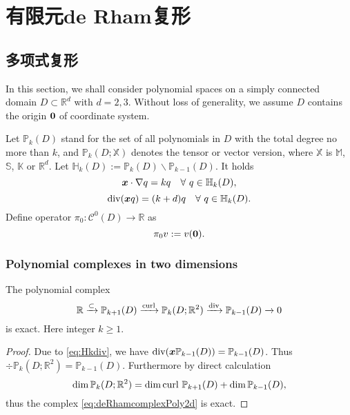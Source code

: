 \chapter{有限元de Rham复形}



\section{多项式复形}

In this section, we shall consider polynomial spaces on a simply connected domain $D\subset\mathbb R^d$ with $d=2,3$. Without loss of generality, we assume $D$ contains the origin $\boldsymbol0$ of coordinate system.

Let $\mathbb P_k(D)$ stand for the set of all polynomials in $D$ with the total degree no more than $k$, and $\mathbb P_k(D; \mathbb{X})$ denotes the tensor or vector version, where $\mathbb{X}$ is $\mathbb M$, $\mathbb{S}$, $\mathbb{K}$ or $\mathbb{R}^d$. Let $\mathbb H_k(D):=\mathbb P_k(D)\backslash \mathbb P_{k-1}(D)$. It holds
\begin{equation}\label{eq:Hkxgrad}
\boldsymbol x\cdot\nabla q=kq\quad\forall~q\in\mathbb H_k(D),
\end{equation}
\begin{equation}\label{eq:Hkdiv}
\operatorname{div}(\boldsymbol x q)=(k+d)q\quad\forall~q\in\mathbb H_k(D).
\end{equation}
Define operator $\pi_{0}: \mathcal C^0(D)\to \mathbb R$ as
\[
\pi_{0}v:=v(\boldsymbol0).
\]


\subsection{Polynomial complexes in two dimensions}
\begin{lemma}
The polynomial complex
\begin{equation}\label{eq:deRhamcomplexPoly2d}
\mathbb R\xrightarrow{\subset} \mathbb P_{k+1}(D)\xrightarrow{\operatorname{curl}} \mathbb P_k(D;\mathbb R^2) \xrightarrow{\operatorname{div}} \mathbb P_{k-1}(D)\xrightarrow{}0
\end{equation}
is exact. Here integer $k\geq1$.
\end{lemma}
\begin{proof}
Due to \eqref{eq:Hkdiv}, we have $\operatorname{div}(\boldsymbol x \mathbb P_{k-1}(D) )= \mathbb P_{k-1}(D)$. Thus $\div\mathbb P_k(D;\mathbb R^2) = \mathbb P_{k-1}(D)$.
Furthermore by direct calculation
\[
\dim\mathbb P_k(D;\mathbb R^2)=\dim \operatorname{curl} \, \mathbb P_{k+1}(D)+\dim \mathbb P_{k-1}(D),
\]
thus the complex \eqref{eq:deRhamcomplexPoly2d} is exact.
\end{proof}


